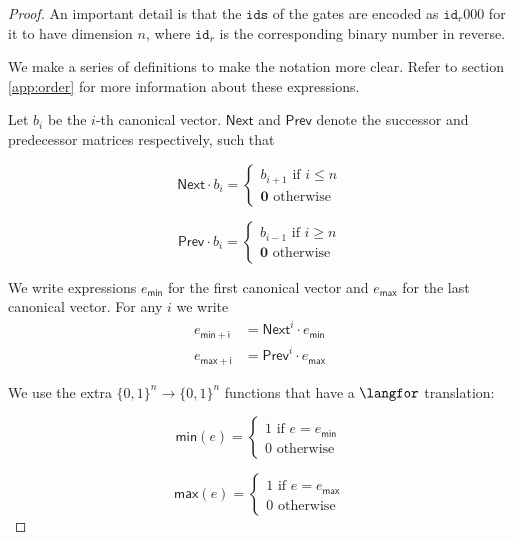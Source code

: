 \begin{proof}

An important detail is that the $\texttt{ids}$ of the gates are encoded as $\texttt{id}_r000$ for it to have dimension $n$, where $\texttt{id}_r$ is the corresponding binary number in reverse.

We make a series of definitions to make the notation more clear. Refer to section \ref{app:order} for more information
about these expressions.

Let $b_i$ be the $i$-th canonical vector. $\mathsf{Next}$ and $\mathsf{Prev}$ denote the successor and predecessor matrices respectively, such that

\[
  			\mathsf{Next}\cdot b_i=\begin{cases}
               b_{i+1} \text{ if } i\leq n \\
               \mathbf{0} \text{ otherwise }
            \end{cases}
\]

\[
  			\mathsf{Prev}\cdot b_i=\begin{cases}
               b_{i-1} \text{ if } i\geq n \\
               \mathbf{0} \text{ otherwise }
            \end{cases}
\]

We write expressions $e_{\mathsf{min}}$ for the first canonical vector and $e_{\mathsf{max}}$ for the last canonical vector. For any $i$ we write 
\begin{align*}
	e_{\mathsf{min}+\mathsf{i}} &= \mathsf{Next}^i\cdot e_{\mathsf{min}} \\
	e_{\mathsf{max}+\mathsf{i}} &= \mathsf{Prev}^i\cdot e_{\mathsf{max}}
\end{align*}

We use the extra $\lbrace 0,1 \rbrace^n\rightarrow\lbrace 0,1 \rbrace^n$ functions that have a $\langfor$ translation:

\[
  			\mathsf{min}(e)=\begin{cases}
               1 \text{ if } e=e_{\mathsf{min}} \\
               0 \text{ otherwise }
             \end{cases}
\]

\[
  			\mathsf{max}(e)=\begin{cases}
               1 \text{ if } e=e_{\mathsf{max}} \\
               0 \text{ otherwise }
             \end{cases}
\]


\end{proof}

